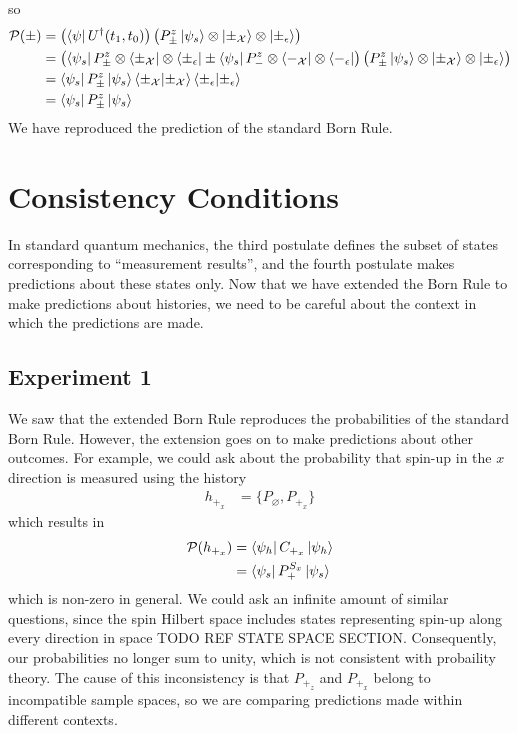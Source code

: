 so
\begin{align}
  \mathcal{P}(\pm) &= \left(\bra{\psi}  U^\dagger(t_1, t_0)\right) \left( P^z_\pm \ket{\psi_s} \otimes \ket{\pm_\mathcal{X}} \otimes \ket{\pm_\epsilon}\right) \\ \nonumber
   &= \left(\bra{\psi_s}P^z_\pm \otimes \bra{\pm_\mathcal{X}} \otimes \bra{\pm_\epsilon} \pm \bra{\psi_s}P^z_- \otimes \bra{-_\mathcal{X}} \otimes \bra{-_\epsilon} \right) \left( P^z_\pm \ket{\psi_s} \otimes \ket{\pm_\mathcal{X}} \otimes \ket{\pm_\epsilon}\right) \\ \nonumber
   &= \bra{\psi_s} P^z_\pm \ket{\psi_s} \braket{\pm_\mathcal{X}|\pm_\mathcal{X}} \braket{\pm_\epsilon|\pm_\epsilon} \\ \nonumber
   &= \bra{\psi_s} P^z_\pm \ket{\psi_s}
\end{align}
We have reproduced the prediction of the standard Born Rule.


\section{Consistency Conditions}

In standard quantum mechanics, the third postulate defines the subset of states corresponding to ``measurement results'', and the fourth postulate makes predictions about these states only. Now that we have extended the Born Rule to make predictions about histories, we need to be careful about the context in which the predictions are made.

\subsection{Experiment 1}

We saw that the extended Born Rule reproduces the probabilities of the standard Born Rule. However, the extension goes on to make predictions about other outcomes. For example, we could ask about the probability that spin-up in the $x$ direction is measured using the history
\begin{align}
  h_{+_x} &= \{P_\varnothing ,P_{+_x} \}
\end{align}
which results in
\begin{align}
  \mathcal{P}(h_{+_x}) &= \bra{\psi_h} C_{+_x} \ket{\psi_h}  \\ \nonumber
  &= \bra{\psi_s} P^{S_x}_+ \ket{\psi_s}
\end{align}
which is non-zero in general. We could ask an infinite amount of similar questions, since the spin Hilbert space includes states representing spin-up along every direction in space TODO REF STATE SPACE SECTION. Consequently, our probabilities no longer sum to unity, which is not consistent with probaility theory. The cause of this inconsistency is that $P_{+_z}$ and $P_{+_x}$ belong to incompatible sample spaces, so we are comparing predictions made within different contexts.

